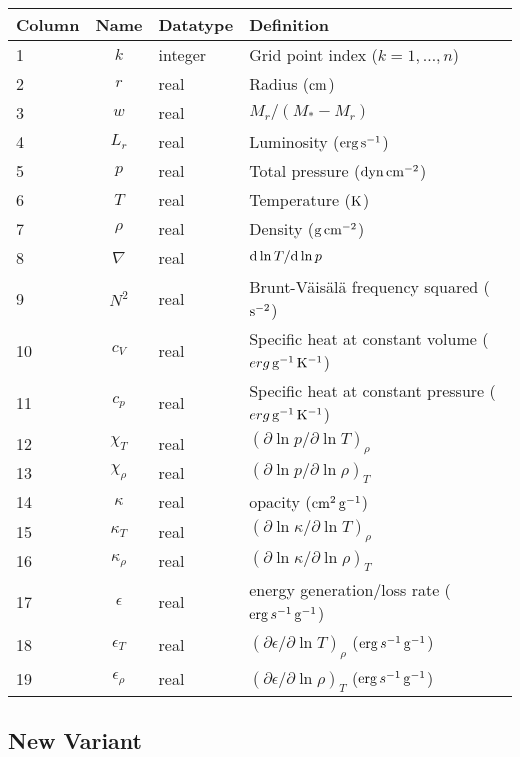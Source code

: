 \documentclass{article}
\newcommand{\diff}{\ensuremath{{\rm d}}}
\newcommand{\Mstar}{\ensuremath{M_{\ast}}}
\newcommand{\cm}{\ensuremath{{\rm cm}}}
\newcommand{\gram}{\ensuremath{{\rm g}}}
\newcommand{\second}{\ensuremath{{\rm s}}}
\newcommand{\dyne}{\ensuremath{{\rm dyn}}}
\newcommand{\erg}{\ensuremath{{\rm erg}}}
\newcommand{\kelvin}{\ensuremath{{\rm K}}}
\begin{document}
\begin{table}[h!]
\begin{tabular}{|l|c|l|l|} \hline
Column & Name & Datatype & Definition \\ \hline
1      & $k$ & integer & Grid point index ($k=1,\ldots,n$) \\
2      & $r$ & real    & Radius ($\cm$) \\
3      & $w$ & real    & $M_{r}/(\Mstar-M_{r})$ \\
4      & $L_{r}$ & real & Luminosity ($\erg\,\second^{-1}$) \\
5      & $p$ & real    & Total pressure ($\dyne\,\cm^{-2}$) \\
6      & $T$ & real    & Temperature ($\kelvin$) \\
7      & $\rho$ & real & Density ($\gram\,\cm^{-2}$) \\
8      & $\nabla$ & real & $\diff \ln T/\diff \ln p$ \\
9      & $N^{2}$ & real & Brunt-V\"ais\"al\"a frequency squared ($\second^{-2}$) \\
10      & $c_{V}$ & real & Specific heat at constant volume ($erg\,\gram^{-1}\,\kelvin^{-1}$) \\
11     & $c_{p}$ & real & Specific heat at constant pressure ($erg\,\gram^{-1}\,\kelvin^{-1}$) \\
12     & $\chi_{T}$ & real & $(\partial \ln p/\partial \ln T)_{\rho} $ \\
13     & $\chi_{\rho}$ & real & $(\partial \ln p/\partial \ln \rho)_{T} $ \\
14     & $\kappa$ & real & opacity ($\cm^{2}\,\gram^{-1}$) \\
15     & $\kappa_{T}$ & real & $(\partial \ln \kappa/\partial \ln T)_{\rho}$ \\
16     & $\kappa_{\rho}$ & real & $(\partial \ln \kappa/\partial \ln \rho)_{T}$ \\
17     & $\epsilon$ & real & energy generation/loss rate ($\erg\,s^{-1}\,\gram^{-1}$) \\
18     & $\epsilon_{T}$ & real & $(\partial \epsilon/\partial \ln T)_{\rho}$ ($\erg\,s^{-1}\,\gram^{-1}$) \\
19     & $\epsilon_{\rho}$ & real & $(\partial \epsilon/\partial \ln \rho)_{T}$ ($\erg\,s^{-1}\,\gram^{-1}$) \\ \hline
\end{tabular}
\end{table}

\subsection*{New Variant}
\end{document}
